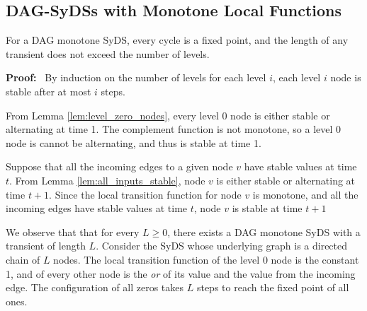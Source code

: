 \subsection{DAG-SyDSs with Monotone Local Functions}
\label{sse:monotoner_functions}

\begin{theorem}\label{thm:montone_stable}
For a DAG monotone SyDS, every cycle is a fixed point, 
and the length of any transient does not exceed the number of levels.
\end{theorem}
\noindent
\textbf{Proof:}~ 
By induction on the number of levels for each level $i$, 
each level $i$ node is stable after at most $i$ steps.

From Lemma \ref{lem:level_zero_nodes}, every level 0 node is either stable or alternating  at time 1.
The complement function is not monotone, so a  level 0 node is cannot be alternating,
and thus is stable at time 1.

Suppose that all the incoming edges to a given node $v$ have stable values at time $t$.
From Lemma \ref{lem:all_inputs_stable}, node $v$ is either stable or alternating  at time $t+1$.
Since the local transition function for node $v$ is monotone, 
and all the incoming edges have stable values at time $t$, node $v$ is stable at time $t+1$
\QED

We observe that that for every $L \geq 0$, there exists a DAG monotone SyDS with 
a transient of length $L$. 
Consider the SyDS whose underlying graph is a directed chain of $L$ nodes.
The local transition function of the level 0 node is the constant 1,
and of every other node is the {\em or} of its value and the value from the incoming edge.
The configuration of all zeros takes $L$ steps to reach the fixed point of all ones.
